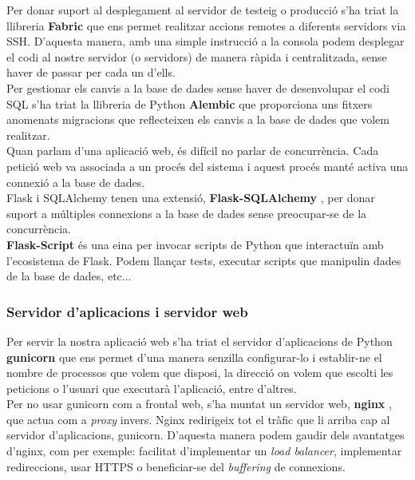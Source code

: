 	Per donar suport al desplegament al servidor de testeig o producció s'ha triat la llibreria \textbf{Fabric} \cite{fabric} que ens permet realitzar accions remotes a diferents servidors via \ac{SSH}. D'aquesta manera, amb una simple instrucció a la consola podem desplegar el codi al nostre servidor (o servidors) de manera ràpida i centralitzada, sense haver de passar per cada un d'ells.\\

	Per gestionar els canvis a la base de dades sense haver de desenvolupar el codi \ac{SQL} s'ha triat la llibreria de Python \textbf{Alembic} \cite{alembic} que proporciona uns fitxers anomenats migracions que reflecteixen els canvis a la base de dades que volem realitzar.\\

	Quan parlam d'una aplicació web, és difícil no parlar de concurrència. Cada petició web va associada a un procés del sistema i aquest procés manté activa una connexió a la base de dades.\\
	
	 Flask i SQLAlchemy tenen una extensió, \textbf{Flask-SQLAlchemy} \cite{flask_sqlalchemy}, per donar suport a múltiples connexions a la base de dades sense preocupar-se de la concurrència. \\

	\textbf{Flask-Script} \cite{flask_script} és una eina per invocar scripts de Python que interactuïn amb l'ecosistema de Flask. Podem llançar tests, executar scripts que manipulin dades de la base de dades, etc...\\
	

	\subsubsection{Servidor d'aplicacions i servidor web}
	
	Per servir la nostra aplicació web s'ha triat el servidor d'aplicacions de Python \textbf{gunicorn} \cite{gunicorn} que ens permet d'una manera senzilla configurar-lo i establir-ne el nombre de processos que volem que disposi, la direcció on volem que escolti les peticions o l'usuari que executarà l'aplicació, entre d'altres.\\

	Per no usar gunicorn com a frontal web, s'ha muntat un servidor web, \textbf{nginx} \cite{nginx}, que actua com a \emph{proxy} invers. Nginx redirigeix tot el tràfic que li arriba cap al servidor d'aplicacions, gunicorn. D'aquesta manera podem gaudir dels avantatges d'nginx, com per exemple: facilitat d'implementar un \emph{load balancer}, implementar redireccions, usar \ac{HTTPS} o beneficiar-se del \emph{buffering} de connexions.

